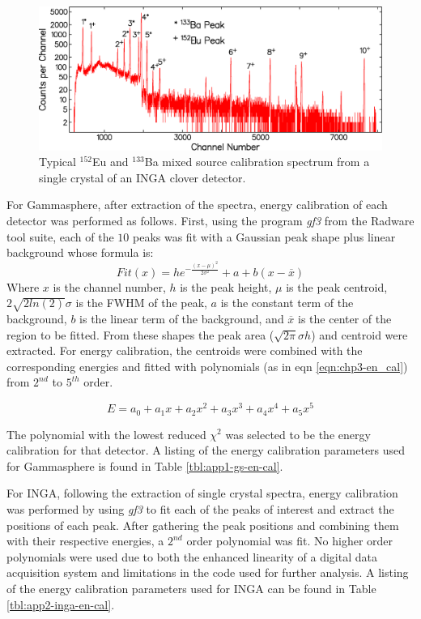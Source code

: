 \begin{figure}[h!]
	\centerline{\includegraphics[height=0.25\textheight]{./img/c3/inga_crystal_en_cal.eps}}
	\caption{Typical $^{152}$Eu and $^{133}$Ba mixed source calibration spectrum from a single crystal of an INGA clover detector.}
	\label{fig:chp3-inga-cal-spec}
\end{figure}

For Gammasphere, after extraction of the spectra, energy calibration of each detector was performed as follows. First, using the program \emph{gf3} from the Radware tool suite\cite{radware}, each of the $10$ peaks was fit with a Gaussian peak shape plus linear background whose formula is:
\begin{equation}
\label{eqn:chp3-pk_fit} 
Fit(x) = h e^{-\frac{(x-\mu{})^2}{2\sigma{}^2}} + a + b (x-\overline{x})
\end{equation}
 Where $x$ is the channel number, $h$ is the peak height, $\mu{}$ is the peak centroid, $2\sqrt{2ln(2)}\sigma{}$ is the FWHM of the peak, $a$ is the constant term of the background, $b$ is the linear term of the background, and $\overline{x}$ is the center of the region to be fitted. From these shapes the peak area ($\sqrt{2\pi{}}\sigma{}h$) and centroid were extracted. For energy calibration, the centroids were combined with the corresponding energies and fitted with polynomials (as in eqn \ref{eqn:chp3-en_cal}) from $2^{nd}$ to $5^{th}$ order.

\begin{equation}
\label{eqn:chp3-en_cal} 
E = a_0 + a_1x + a_2x^2 + a_3x^3 + a_4x^4 + a_5x^5
\end{equation}

The polynomial with the lowest reduced $\chi{}^2$ was selected to be the energy calibration for that detector. A listing of the energy calibration parameters used for Gammasphere is found in Table \ref{tbl:app1-gs-en-cal}.

For INGA, following the extraction of single crystal spectra, energy calibration was performed by using \emph{gf3} to fit each of the peaks of interest and extract the positions of each peak. After gathering the peak positions and combining them with their respective energies, a $2^{nd}$ order polynomial was fit. No higher order polynomials were used due to both the enhanced linearity of a digital data acquisition system and limitations in the code used for further analysis. A listing of the energy calibration parameters used for INGA can be found in Table \ref{tbl:app2-inga-en-cal}.

